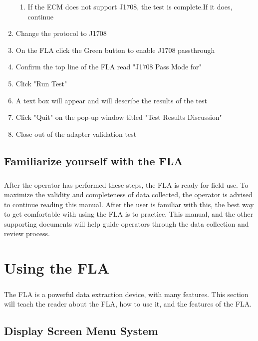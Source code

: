 \documentclass[11pt, oneside]{book}
\begin{document}
\begin{enumerate}
\begin{enumerate}
\item If the ECM does not support J1708, the test is complete.If it does,
continue
\end{enumerate}\label{enu:J1708-pass-mode}
\item Change the protocol to J1708
\item On the FLA click the Green button to enable J1708 passthrough
\item Confirm the top line of the FLA read "J1708 Pass Mode
for"
\item Click "Run Test"
\item A text box will appear and will describe the results of the test
\item Click "Quit" on the pop-up window titled
"Test Results Discussion"
\item Close out of the adapter validation test
\end{enumerate}


\section{Familiarize yourself with the FLA}
\paragraph{  }
After the operator has performed these steps, the FLA is ready for
field use. To maximize the validity and completeness
of data collected, the operator is advised to continue reading this
manual. After the user is familiar with this, the best way to get
comfortable with using the FLA is to practice. This manual, and the
other supporting documents will help guide operators through the data collection and review process.


\chapter{Using the FLA}
\paragraph{  }
The FLA is a powerful data extraction device, with many features.
This section will teach the reader about the FLA, how to use it, and the features of the FLA.


\section{Display Screen Menu System}
\end{document}
